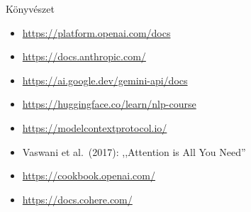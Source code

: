 \documentclass[aspectratio=169, 12pt]{beamer}
\begin{document}
\begin{frame}[plain]{Könyvészet}
  \vspace{0.5cm}
  {\small
  \begin{itemize}\setlength{\itemsep}{2pt}
    \item \url{https://platform.openai.com/docs}
    \item \url{https://docs.anthropic.com/}
    \item \url{https://ai.google.dev/gemini-api/docs}
    \item \url{https://huggingface.co/learn/nlp-course}
    \item \url{https://modelcontextprotocol.io/}
    \item Vaswani et al.\ (2017): ,,Attention is All You Need''
    \item \url{https://cookbook.openai.com/}
    \item \url{https://docs.cohere.com/}
  \end{itemize}
  }
\end{frame}
\end{document}
